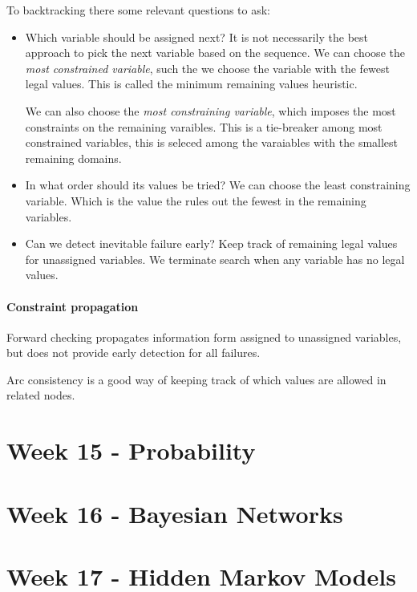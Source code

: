 \documentclass{article}
\begin{document}
To backtracking there some relevant questions to ask:

\begin{itemize}
  \item Which variable should be assigned next? It is not necessarily the best
    approach to pick the next variable based on the sequence.
    \subitem We can choose the \emph{most constrained variable}, such the we
    choose the variable with the fewest legal values. This is called the minimum
    remaining values heuristic.

    We can also choose the \emph{most constraining variable}, which imposes the
    most constraints on the remaining varaibles. This is a tie-breaker among
    most constrained variables, this is seleced among the varaiables with the
    smallest remaining domains. 
  \item In what order should its values be tried?
    \subitem We can choose the least constraining variable. Which is the value
    the rules out the fewest in the remaining variables.
  \item Can we detect inevitable failure early? 
    \subitem Keep track of remaining legal values for unassigned variables. We
    terminate search when any variable has no legal values.
\end{itemize}

\paragraph{Constraint propagation}%
\label{par:constraint_propagation}

Forward checking propagates information form assigned to unassigned variables,
but does not provide early detection for all failures.

Arc consistency is a good way of keeping track of which values are allowed in
related nodes.

\newpage
\section{Week 15 - Probability}%
\label{sec:12_march_probability}

\newpage
\section{Week 16 - Bayesian Networks}%
\label{sec:20_march_bayesian_networks}

\newpage
\section{Week 17 - Hidden Markov Models}%
\label{sec:27_march_hidden_markov_models}
\end{document}
